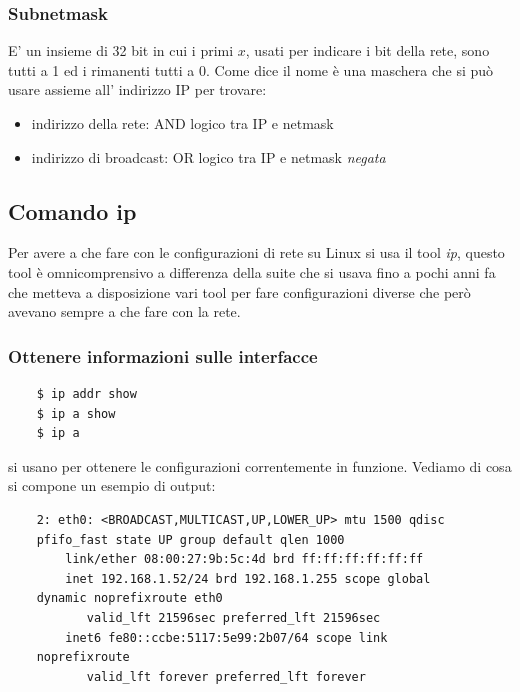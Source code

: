 \subsubsection{Subnetmask}
E' un insieme di 32 bit in cui i primi $x$, usati per indicare i bit della rete, sono tutti a 1 ed i rimanenti tutti a 0.
Come dice il nome è una maschera che si può usare assieme all' indirizzo IP per trovare:
\begin{itemize}
    \item indirizzo della rete: AND logico tra IP e netmask
    \item indirizzo di broadcast: OR logico tra IP e netmask \emph{negata}
\end{itemize}

\subsection{Comando ip}
Per avere a che fare con le configurazioni di rete su Linux si usa il tool \emph{ip}, questo tool è omnicomprensivo a differenza della suite che si usava fino a pochi anni fa che metteva a disposizione vari tool per fare configurazioni diverse che però avevano sempre a che fare con la rete.

\subsubsection{Ottenere informazioni sulle interfacce}
\begin{verbatim}
    $ ip addr show
    $ ip a show
    $ ip a
\end{verbatim}
si usano per ottenere le configurazioni correntemente in funzione.
Vediamo di cosa si compone un esempio di output:
\begin{verbatim}
    2: eth0: <BROADCAST,MULTICAST,UP,LOWER_UP> mtu 1500 qdisc
    pfifo_fast state UP group default qlen 1000
        link/ether 08:00:27:9b:5c:4d brd ff:ff:ff:ff:ff:ff
        inet 192.168.1.52/24 brd 192.168.1.255 scope global
    dynamic noprefixroute eth0
           valid_lft 21596sec preferred_lft 21596sec
        inet6 fe80::ccbe:5117:5e99:2b07/64 scope link
    noprefixroute 
           valid_lft forever preferred_lft forever
\end{verbatim}

